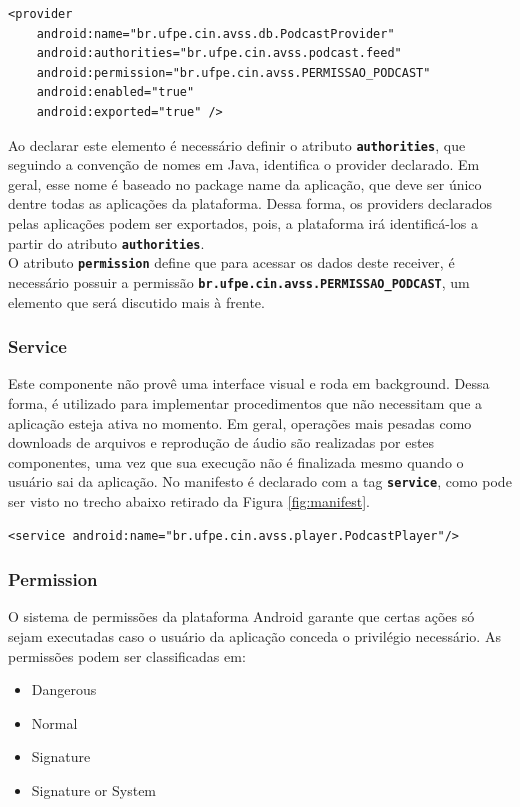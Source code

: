 \documentclass[a4paper,12pt]{article}
\begin{document}
{\fontsize{9pt}{12pt}
\begin{verbatim}
<provider
    android:name="br.ufpe.cin.avss.db.PodcastProvider"
    android:authorities="br.ufpe.cin.avss.podcast.feed"
    android:permission="br.ufpe.cin.avss.PERMISSAO_PODCAST"
    android:enabled="true"
    android:exported="true" />

\end{verbatim}
}


Ao declarar este elemento é necessário definir o atributo {\small\texttt{\textbf{authorities}}}, que seguindo a convenção de nomes em Java, identifica o provider declarado. Em geral, esse nome é baseado no package name da aplicação, que deve ser único dentre todas as aplicações da plataforma. Dessa forma, os providers declarados pelas aplicações podem ser exportados, pois, a plataforma irá identificá-los a partir do atributo {\small\texttt{\textbf{authorities}}}.\\

O atributo {\small\texttt{\textbf{permission}}} define que para acessar os dados deste receiver, é necessário possuir a permissão {\small\texttt{\textbf{br.ufpe.cin.avss.PERMISSAO\_PODCAST}}}, um elemento que será discutido mais à frente.




\subsubsection{Service}



Este componente não provê uma interface visual e roda em background. Dessa forma, é utilizado para implementar procedimentos  que não necessitam que a aplicação esteja ativa no momento. Em geral, operações mais pesadas como downloads de arquivos e reprodução de áudio são realizadas por estes componentes, uma vez que sua execução não é finalizada mesmo quando o usuário sai da aplicação. No manifesto é declarado com a tag {\small\texttt{\textbf{service}}}, como pode ser visto no trecho abaixo retirado da Figura \ref{fig:manifest}.
{\fontsize{9pt}{12pt}
\begin{verbatim}
<service android:name="br.ufpe.cin.avss.player.PodcastPlayer"/>
\end{verbatim}
}

\subsubsection{Permission}
O sistema de permissões da plataforma Android garante que certas ações só sejam executadas caso o usuário da aplicação conceda o privilégio necessário. As permissões podem ser classificadas em:
\begin{itemize}
    \item {Dangerous}
    \item {Normal}
    \item {Signature}
    \item {Signature or System}
\end{itemize}
\end{document}
